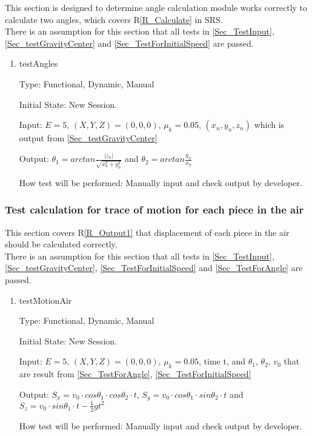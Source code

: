 \documentclass[12pt, titlepage]{article}
\newcommand{\rref}[1]{R\ref{#1}}
\begin{document}
This section is designed to determine  angle calculation module works correctly to calculate two angles, which covers \rref{R_Calculate} in SRS. \\
There is an assumption for this section that all tests in \ref{Sec_TestInput}, \ref{Sec_testGravityCenter} and \ref{Sec_TestForInitialSpeed} are passed.
\begin{enumerate}

\item{testAngles\\}

Type: Functional, Dynamic, Manual

Initial State: New Session.

Input: $E = 5$, $(X,Y,Z) = (0,0,0)$, $\mu_{k} = 0.05$, $(x_{n},y_{n},z_{n})$ which is output from \ref{Sec_testGravityCenter}  

Output: $\theta_{1}=arctan \frac{|z_{n}|}{\sqrt{x_{n}^2+y_{n}^2}}$ and $\theta_{2}=arctan \frac{y_{n}}{x_{n}}$

How test will be performed: Manually input and check output by developer.

\end{enumerate}

\subsubsection{Test calculation for trace of motion for each piece in the air}
\label{Sec_TestMotionAir}

This section covers \rref{R_Output1} that displacement of each piece in the air should be calculated correctly.\\ 
There is an assumption for this section that all tests in \ref{Sec_TestInput}, \ref{Sec_testGravityCenter}, \ref{Sec_TestForInitialSpeed} and \ref{Sec_TestForAngle} are passed.
\begin{enumerate}

\item{testMotionAir\\}

Type: Functional, Dynamic, Manual

Initial State: New Session.

Input: $E = 5$, $(X,Y,Z) = (0,0,0)$, $\mu_{k} = 0.05$, time t, and $\theta_{1}$, $\theta_{2}$, $v_{0}$ that are result from \ref{Sec_TestForAngle}, \ref{Sec_TestForInitialSpeed}

Output: $S_{x}=v_{0}\cdot cos\theta _{1}\cdot cos\theta _{2}\cdot t$, $S_{y}=v_{0}\cdot cos\theta _{1}\cdot sin\theta _{2}\cdot t$ and $S_{z}=v_{0}\cdot sin\theta _{1}\cdot t-\frac{1}{2}gt^{2}$

How test will be performed: Manually input and check output by developer.

\end{enumerate}
\end{document}
